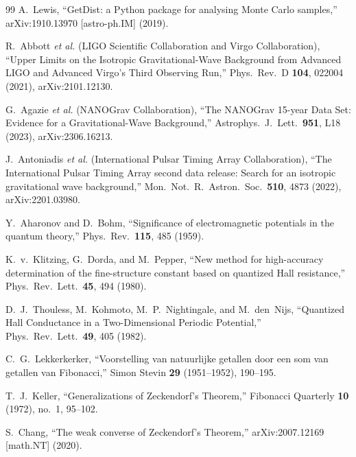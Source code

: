 \documentclass[
  reprint,
  amsmath,amssymb,
  aps,
  prd,
  superscriptaddress,
  nofootinbib,
  longbibliography
]{revtex4-2}
\theoremstyle{definition}
\theoremstyle{remark}
\begin{document}
\begin{thebibliography}{99}
A.~Lewis,
``GetDist: a Python package for analysing Monte Carlo samples,''
arXiv:1910.13970 [astro-ph.IM] (2019).

R.~Abbott \textit{et al.} (LIGO Scientific Collaboration and Virgo Collaboration),
``Upper Limits on the Isotropic Gravitational-Wave Background from Advanced LIGO and Advanced Virgo's Third Observing Run,''
Phys.\ Rev.\ D \textbf{104}, 022004 (2021),
arXiv:2101.12130.

G.~Agazie \textit{et al.} (NANOGrav Collaboration),
``The NANOGrav 15-year Data Set: Evidence for a Gravitational-Wave Background,''
Astrophys.\ J.\ Lett.\ \textbf{951}, L18 (2023),
arXiv:2306.16213.

J.~Antoniadis \textit{et al.} (International Pulsar Timing Array Collaboration),
``The International Pulsar Timing Array second data release: Search for an isotropic gravitational wave background,''
Mon.\ Not.\ R.\ Astron.\ Soc.\ \textbf{510}, 4873 (2022),
arXiv:2201.03980.

Y.~Aharonov and D.~Bohm,
``Significance of electromagnetic potentials in the quantum theory,''
Phys.\ Rev.\ \textbf{115}, 485 (1959).

K.~v.~Klitzing, G.~Dorda, and M.~Pepper,
``New method for high-accuracy determination of the fine-structure constant based on quantized Hall resistance,''
Phys.\ Rev.\ Lett.\ \textbf{45}, 494 (1980).

D.~J.~Thouless, M.~Kohmoto, M.~P.~Nightingale, and M.~den~Nijs,
``Quantized Hall Conductance in a Two-Dimensional Periodic Potential,''
Phys.\ Rev.\ Lett.\ \textbf{49}, 405 (1982).


C.~G.~Lekkerkerker,
``Voorstelling van natuurlijke getallen door een som van getallen van Fibonacci,''
Simon Stevin \textbf{29} (1951--1952), 190--195.

T.~J.~Keller,
``Generalizations of Zeckendorf's Theorem,''
Fibonacci Quarterly \textbf{10} (1972), no.~1, 95--102.

S.~Chang,
``The weak converse of Zeckendorf's Theorem,''
arXiv:2007.12169 [math.NT] (2020).

\end{thebibliography}
\end{document}
